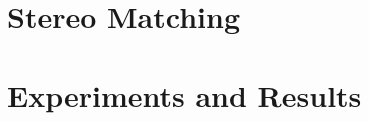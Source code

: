 \documentclass[letterpaper, 10 pt, conference]{ieeeconf}  %
\begin{document}
\section{Stereo Matching}
\section{Experiments and Results}
 

\end{document}
